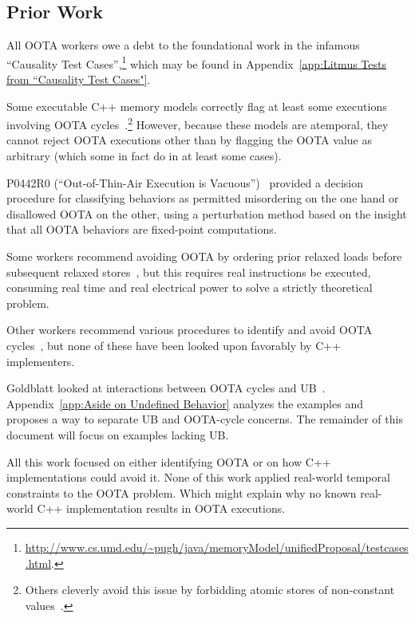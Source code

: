 \documentclass[10]{article}
\begin{document}
\subsection{Prior Work}
\label{sec:Prior Work}

All OOTA workers owe a debt to the foundational work in the infamous
``Causality Test Cases'',\footnote{
	\url{http://www.cs.umd.edu/~pugh/java/memoryModel/unifiedProposal/testcases.html}.}
which may be found in
Appendix~\ref{app:Litmus Tests from “Causality Test Cases"}.

Some executable C++ memory models correctly flag at least some executions
involving OOTA cycles~\cite{JadeAlglave2014HerdingCats}.\footnote{
	Others cleverly avoid this issue by forbidding atomic
	stores of non-constant values~\cite{MarkBatty2011cppmem}.}
However, because these models are atemporal, they cannot reject
OOTA executions other than by flagging the OOTA value as arbitrary
(which some in fact do in at least some cases).

P0442R0 (``Out-of-Thin-Air Execution is Vacuous'')~\cite{PaulEMcKenney2016OOTA}
provided a decision procedure for classifying behaviors as permitted
misordering on the one hand or disallowed OOTA on the other, using
a perturbation method based on the insight that all OOTA behaviors are
fixed-point computations.

Some workers recommend avoiding OOTA by ordering prior relaxed
loads before subsequent relaxed
stores~\cite{Boehm:2014:OGA:2618128.2618134,HansBoehm2019OOTArevisitedAgain,Lahav:2017:RSC:3062341.3062352},
but this requires real instructions be executed, consuming real
time and real electrical power to solve a strictly theoretical
problem.

Other workers recommend various procedures to identify and avoid OOTA
cycles~\cite{Lahav:2017:RSC:3062341.3062352,Sinclair:2017:CAR:3079856.3080206,Lee:10.1145/3385412.3386010,MarkBatty2019ModularRelaxedDependenciesOOTA},
but none of these have been looked upon favorably by C++ implementers.

Goldblatt looked at interactions between OOTA cycles and
UB~\cite{DavidGoldblatt2019NoElegantOOTAfix}.
Appendix~\ref{app:Aside on Undefined Behavior}
analyzes the examples and proposes a way to separate UB and OOTA-cycle
concerns.
The remainder of this document will focus on examples lacking UB.

All this work focused on either identifying OOTA or on how C++
implementations could avoid it.
None of this work applied real-world temporal constraints to the OOTA
problem.
Which might explain why no known real-world C++ implementation results
in OOTA executions.
\end{document}
